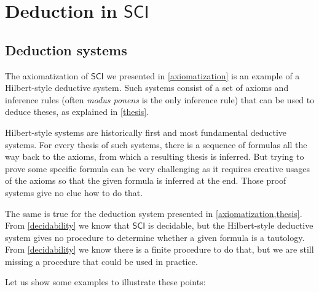 \documentclass{article}
\theoremstyle{definition}
\theoremstyle{definition}
\theoremstyle{definition}
\newcommand{\SCI}{$\mathsf{SCI}$\xspace}
\begin{document}
\section{Deduction in \SCI}

\subsection{Deduction systems}

The axiomatization of \SCI we presented in \cref{axiomatization} is an example
of a Hilbert-style deductive system. Such systems consist of a set of axioms
and inference rules (often \emph{modus ponens} is the only inference rule) that
can be used to deduce theses, as explained in \cref{thesis}.

Hilbert-style systems are historically first and most fundamental deductive
systems. For every thesis of such systems, there is a sequence of formulas all
the way back to the axioms, from which a resulting thesis is inferred. But
trying to prove some specific formula can be very challenging as it requires
creative usages of the axioms so that the given formula is inferred at the end.
Those proof systems give no clue how to do that.

The same is true for the deduction system presented in
\cref{axiomatization,thesis}. From \cref{decidability} we know that \SCI is
decidable, but the Hilbert-style deductive system gives no procedure to
determine whether a given formula is a tautology. From \cref{decidability} we
know there is a finite procedure to do that, but we are still missing a
procedure that could be used in practice.

Let us show some examples to illustrate these points:
\end{document}
